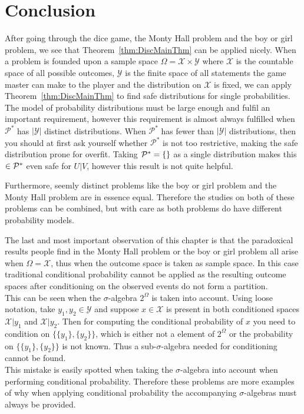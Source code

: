 \documentclass[a4paper]{report}
\theoremstyle{plain}
\theoremstyle{definition}
\theoremstyle{remark}
\numberwithin{equation}{chapter}
\let\P\relax
\DeclareMathOperator{\P}{\mathbb{P}}
\DeclareMathOperator{\1}{\mathbbm{1}}
\newcommand{\X}{\mathcal{X}}
\newcommand{\Y}{\mathcal{Y}}
\newcommand{\Pmod}{\mathcal{P}^*}
\begin{document}
\section{Conclusion}\label{sec:DiscConcl}
After going through the dice game, the Monty Hall problem and the boy or girl problem, we see that Theorem~\ref{thm:DiscMainThm} can be applied nicely. When a problem is founded upon a sample space $\Omega=\X\times\Y$ where $\X$ is the countable space of all possible outcomes, $\Y$ is the finite space of all statements the game master can make to the player and the distribution on $\X$ is fixed, we can apply Theorem~\ref{thm:DiscMainThm} to find safe distributions for single probabilities. The model of probability distributions must be large enough and fulfil an important requirement, however this requirement is almost always fulfilled when $\Pmod$ has $|\Y|$ distinct distributions. When $\Pmod$ has fewer than $|\Y|$ distributions, then you should at first ask yourself whether $\Pmod$ is not too restrictive, making the safe distribution prone for overfit. Taking $\Pmod=\{\P\}$ as a single distribution makes this $\P\in\Pmod$ even safe for $U|V$, however this result is not quite helpful.

Furthermore, seemly distinct problems like the boy or girl problem and the Monty Hall problem are in essence equal. Therefore the studies on both of these problems can be combined, but with care as both problems do have different probability models.

The last and most important observation of this chapter is that the paradoxical results people find in the Monty Hall problem or the boy or girl problem all arise when $\Omega=\X$, thus when the outcome space is taken as sample space. In this case traditional conditional probability cannot be applied as the resulting outcome spaces after conditioning on the observed events do not form a partition.\\
This can be seen when the $\sigma$-algebra $2^{\Omega}$ is taken into account. Using loose notation, take $y_1,y_2\in\Y$ and suppose $x\in\X$ is present in both conditioned spaces $\X|y_1$ and $\X|y_2$. Then for computing the conditional probability of $x$ you need to condition on $\{\{y_1\},\{y_2\}\}$, which is either not a element of $2^\Omega$ or the probability on $\{\{y_1\},\{y_2\}\}$ is not known. Thus a sub-$\sigma$-algebra needed for conditioning cannot be found.\\
This mistake is easily spotted when taking the $\sigma$-algebra into account when performing conditional probability. Therefore these problems are more examples of why when applying conditional probability the accompanying $\sigma$-algebras must always be provided.
\end{document}
